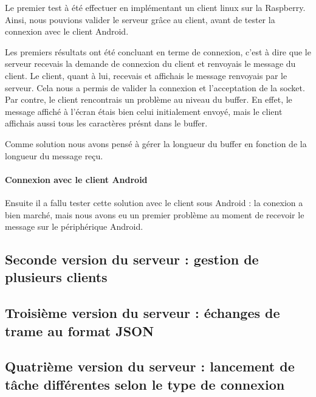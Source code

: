 \documentclass[a4paper,10pt]{article}
\begin{document}
Le premier test à été effectuer en implémentant un client linux sur la Raspberry. Ainsi, nous pouvions valider le serveur grâce au client, avant de tester la connexion avec le client Android.

Les premiers résultats ont été concluant en terme de connexion, c'est à dire que le serveur recevais la demande de connexion du client et renvoyais le message du client. Le client, quant à lui, recevais et affichais le message renvoyais par le serveur. Cela nous a permis de valider la connexion et l'acceptation de la socket. Par contre, le client rencontrais un problème au niveau du buffer. En effet, le message affiché à l'écran étais bien celui initialement envoyé, mais le client affichais aussi tous les caractères présnt dans le buffer. %

Comme solution nous avons pensé à gérer la longueur du buffer en fonction de la longueur du message reçu.


\paragraph{Connexion avec le client Android}
Ensuite il a fallu tester cette solution avec le client sous Android : la conexion a bien marché, mais nous avons eu un premier problème au moment de recevoir le message sur le périphérique Android.

\subsection{Seconde version du serveur : gestion de plusieurs clients}

\subsection{Troisième version du serveur : échanges de trame au format JSON}

\subsection{Quatrième version du serveur : lancement de tâche différentes selon le type de connexion}

\end{document}
